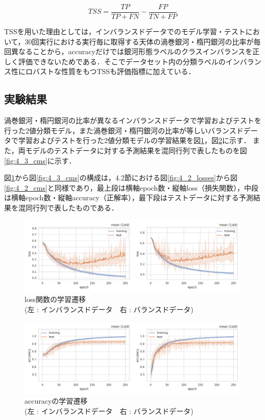 \documentclass[a4j, 11pt]{jreport}
\begin{document}
\begin{equation}
	TSS = \frac{TP}{TP + FN} - \frac{FP}{TN + FP}
 \label{equ:tss}
\end{equation}

TSSを用いた理由としては，インバランスドデータでのモデル学習・テストにおいて，30回実行における実行毎に取得する天体の渦巻銀河・楕円銀河の比率が毎回異なることから，accuracyだけでは銀河形態ラベルのクラスインバランスを正しく評価できないためである．そこでデータセット内の分類ラベルのインバランス性にロバストな性質をもつTSSも評価指標に加えている．

\subsection{実験結果}
渦巻銀河・楕円銀河の比率が異なるインバランスドデータで学習およびテストを行った2値分類モデル，また渦巻銀河・楕円銀河の比率が等しいバランスドデータで学習およびテストを行った2値分類モデルの学習結果を図\ref{fig:4_3_losses}，図\ref{fig:4_3_accs}に示す．
また，両モデルのテストデータに対する予測結果を混同行列で表したものを図\ref{fig:4_3_cms}に示す．

図\ref{fig:4_3_losses}から図\ref{fig:4_3_cms}の構成は，4.2節における図\ref{fig:4_2_losses}から図\ref{fig:4_2_cms}と同様であり，最上段は横軸epoch数・縦軸loss（損失関数），中段は横軸epoch数・縦軸accuracy（正解率），最下段はテストデータに対する予測結果を混同行列で表したものである．


\begin{figure}[H]
  \centering
  \includegraphics[width=1\hsize, keepaspectratio]{images/drawio/4_3_losses.png}
  \caption{loss関数の学習遷移\\(左 : インバランスドデータ　右 : バランスドデータ)}
  \label{fig:4_3_losses}
\end{figure}
 
\begin{figure}[H]
  \centering
  \includegraphics[width=1\hsize, keepaspectratio]{images/drawio/4_3_accs.png}
  \caption{accuracyの学習遷移\\(左 : インバランスドデータ　右 : バランスドデータ)}
  \label{fig:4_3_accs}
\end{figure}
 
\end{document}
